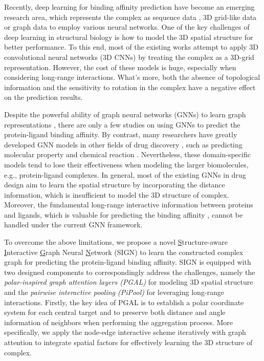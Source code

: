 \documentclass[sigconf]{acmart}
\newcommand{\model}{\textsf{SIGN}\xspace}
\newcommand{\gnn}{PGAL\xspace}
\newcommand{\pool}{PiPool\xspace}
\begin{document}
Recently, deep learning for binding affinity prediction have become an emerging research area, which represents the complex as sequence data \cite{ozturk2018deepdta}, 3D grid-like data \cite{wallach2015atomnet} or graph data \cite{10.1093/bioinformatics/btaa921} to employ various neural networks. One of the key challenges of deep learning in structural biology is how to model the 3D spatial structure for better performance. To this end, most of the existing works  attempt to apply 3D convolutional neural networks (3D CNNs) by treating the complex as a 3D-grid representation. However, the cost of these models is huge, especially when considering long-range interactions. What's more, both the absence of topological information and the sensitivity to rotation in the complex have a negative effect on the prediction results. 

Despite the powerful ability of graph neural networks (GNNs) to learn graph representations \cite{li2020competitive,zheng2021drug,liu2021vldb}, there are only a few studies \cite{lim2019predicting,10.1093/bioinformatics/btaa921} on using GNNs to predict the protein-ligand binding affinity. By contrast, many researchers have greatly developed GNN models in other fields of drug discovery , such as predicting molecular property \cite{yang2019analyzing,maziarka2020molecule,klicpera_dimenet_2020} and chemical reaction \cite{do2019graph}. Nevertheless, these domain-specific models tend to lose their effectiveness when modeling the larger biomolecules, e.g., protein-ligand complexes. In general, most of the existing GNNs in drug design aim to learn the spatial structure by incorporating the distance information, which is insufficient to model the 3D structure of complex. Moreover, the fundamental long-range interactive information between proteins and ligands, which is valuable for predicting the binding affinity \cite{leckband1992long}, cannot be handled under the current GNN framework.

To overcome the above limitations, we propose a novel \underline{S}tructure-aware \underline{I}nteractive \underline{G}raph Neural \underline{N}etwork (\model) to learn the constructed complex graph for predicting the protein-ligand binding affinity. \model is equipped with two designed components to correspondingly address the challenges, namely the \textit{polar-inspired graph attention layers (\gnn)} for modeling 3D spatial structure and the \textit{pairwise interactive pooling (\pool)} for leveraging long-range interactions.
Firstly, the key idea of \gnn is to establish a polar coordinate system for each central target and to preserve both distance and angle information of neighbors when performing the aggregation process. More specifically, we apply the node-edge interactive scheme iteratively with graph attention to integrate spatial factors for effectively learning the 3D structure of complex. 
\end{document}
